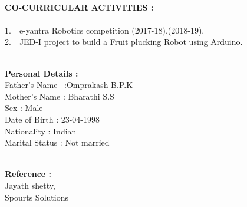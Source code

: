 \documentclass[1pt]{article}
\begin{document}
\begin{flushleft}
\begin{flushleft}
			
			\hspace{1cm}\\ \hspace{1cm}
			
			
			{\small \textbf{CO-CURRICULAR ACTIVITIES :}}\\ \ \\
			1.\ \ e-yantra Robotics competition (2017-18),(2018-19).\\	
			2.\ \ JED-I project to build a Fruit plucking Robot using Arduino.\\
			
			
			\hspace{1cm}\\ \hspace{1cm}
			
			
			{\small \textbf{ Personal Details :}}\\
			\hspace{1cm}Father's Name \ :Omprakash B.P.K\\	
			\hspace{1cm}Mother's Name : Bharathi S.S\\
			\hspace{1cm}Sex : Male\\	
			\hspace{1cm}Date of Birth : 23-04-1998\\
			\hspace{1cm}Nationality : Indian\\
			\hspace{1cm}Marital Status : Not married\\
			
			\hspace{1cm}\\ \hspace{1cm}
			
			{\small \textbf{Reference :}}\\
			\hspace{1cm} Jayath shetty,\\	
			\hspace{1cm} Spourts Solutions\\
		
			
		\end{flushleft}
	
	\end{flushleft}
	
\end{document}

